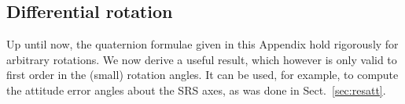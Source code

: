 \documentclass[structabstract]{aa}
\newcommand{\quat}[1]{\mathbf{#1}}
\begin{document}
\begin{algorithm}[t]
\caption{For given $\vec{A}=[ A_{xx}~A_{xy}~A_{xz};~A_{yx}~\cdots ]$,
this algorithm returns a unit quaternion $\quat{q}=\{q_x,\,q_y,\,q_z,\,q_w\}$
such that Eq.~(\ref{eq:quat2mat}) is satisfied.}
\label{algo:A1}
\begin{algorithmic}[1]
\ENDFOR
{}
\ELSE
\ENDIF
{}
\end{algorithmic}
\end{algorithm}


\subsection{Differential rotation}\label{sec:diffrot}

Up until now, the quaternion formulae given in this Appendix hold rigorously 
for arbitrary rotations. We now derive a useful result, which however is only valid 
to first order in the (small) rotation angles. It can be used, for example, to compute 
the attitude error angles about the SRS axes, as was done in Sect.~\ref{sec:resatt}.
\end{document}
